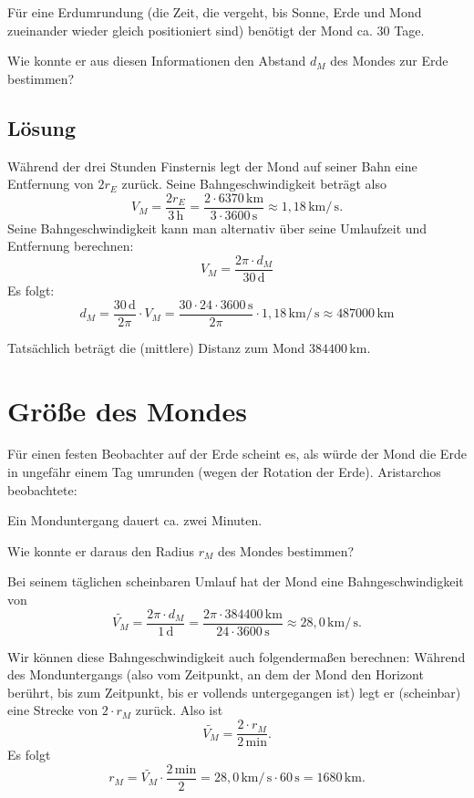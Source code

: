 \documentclass{scrartcl}
\newcommand{\RE}{r_E} %
\newcommand{\RM}{r_M} %
\newcommand{\DM}{d_M} %
\newcommand{\VM}{V_M} %
\newcommand{\km}{\,\mathrm{km}} %
\newcommand{\hour}{\,\mathrm{h}} %
\newcommand{\minu}{\,\mathrm{min}} %
\newcommand{\seco}{\,\mathrm{s}} %
\newcommand{\days}{\,\mathrm{d}} %
\begin{document}
  Für eine Erdumrundung (die Zeit, die vergeht, bis Sonne, Erde und Mond zueinander wieder gleich positioniert sind) benötigt der Mond ca. 30 Tage.

  Wie konnte er aus diesen Informationen den Abstand $\DM$ des Mondes zur Erde bestimmen?

  \newpage
  \subsection{Lösung}

  Während der drei Stunden Finsternis legt der Mond auf seiner Bahn eine Entfernung von $2 \RE$ zurück. Seine Bahngeschwindigkeit beträgt also
  \[ \VM = \frac{2 \RE}{3 \hour} = \frac{2 \cdot 6370 \km}{3 \cdot 3600 \seco} \approx 1,18 \km / \seco. \]
  Seine Bahngeschwindigkeit kann man alternativ über seine Umlaufzeit und Entfernung berechnen:
  \[ \VM = \frac{2\pi \cdot \DM}{30 \days} \]
  Es folgt:
  \[ \DM = \frac{30 \days}{2 \pi} \cdot \VM = \frac{30 \cdot 24 \cdot 3600 \seco}{2 \pi} \cdot 1,18 \km / \seco \approx 487000 \km \]

  Tatsächlich beträgt die (mittlere) Distanz zum Mond $384400 \km$.

  \newpage
  \section{Größe des Mondes}

  Für einen festen Beobachter auf der Erde scheint es, als würde der Mond die Erde in ungefähr einem Tag umrunden (wegen der Rotation der Erde). Aristarchos beobachtete:

  Ein Monduntergang dauert ca. zwei Minuten.

  Wie konnte er daraus den Radius $\RM$ des Mondes bestimmen?

  \newpage

  Bei seinem täglichen scheinbaren Umlauf hat der Mond eine Bahngeschwindigkeit von
  \[ \tilde{\VM} = \frac{2\pi \cdot \DM}{1 \days} = \frac{2\pi \cdot 384400 \km}{24 \cdot 3600 \seco} \approx 28,0 \km / \seco. \]

  Wir können diese Bahngeschwindigkeit auch folgendermaßen berechnen: Während des Monduntergangs (also vom Zeitpunkt, an dem der Mond den Horizont berührt, bis zum Zeitpunkt, bis er vollends untergegangen ist) legt er (scheinbar) eine Strecke von $2 \cdot \RM$ zurück. Also ist
  \[ \tilde{\VM} = \frac{2 \cdot \RM}{2 \minu}. \]
  Es folgt
  \[ \RM = \tilde{\VM} \cdot \frac{2 \minu}{2} = 28,0 \km / \seco \cdot 60 \seco = 1680 \km. \]
\end{document}
